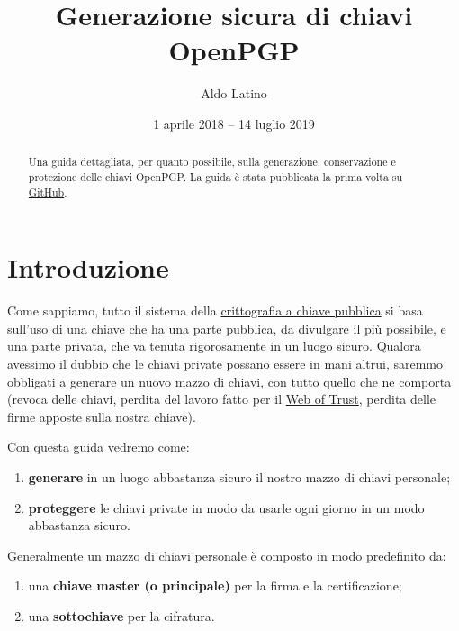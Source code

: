 \documentclass[a4paper,10pt]{article}
\title{Generazione sicura di chiavi OpenPGP}
\author{Aldo Latino}
\date{1 aprile 2018 -- 14 luglio 2019}
\begin{document}
\maketitle


\begin{abstract}
Una guida dettagliata, per quanto possibile, sulla generazione, conservazione e protezione delle chiavi OpenPGP. La guida è stata pubblicata la prima volta su \href{https://github.com/aldolat/generazione-sicura-chiavi-openpgp}{GitHub}.
\end{abstract}

\tableofcontents

\newpage

\section{Introduzione}

Come sappiamo, tutto il sistema della \href{https://it.wikipedia.org/wiki/Crittografia_asimmetrica}{crittografia a chiave pubblica} si basa sull'uso di una chiave che ha una parte pubblica, da divulgare il più possibile, e una parte privata, che va tenuta rigorosamente in un luogo sicuro. Qualora avessimo il dubbio che le chiavi private possano essere in mani altrui, saremmo obbligati a generare un nuovo mazzo di chiavi, con tutto quello che ne comporta (revoca delle chiavi, perdita del lavoro fatto per il \href{https://it.wikipedia.org/wiki/Web_of_trust}{Web of Trust}, perdita delle firme apposte sulla nostra chiave).

Con questa guida vedremo come:

\begin{enumerate}
 \item \textbf{generare} in un luogo abbastanza sicuro il nostro mazzo di chiavi personale;
 \item \textbf{proteggere} le chiavi private in modo da usarle ogni giorno in un modo abbastanza sicuro.
\end{enumerate}

Generalmente un mazzo di chiavi personale è composto in modo predefinito da:

\begin{enumerate}
 \item una \textbf{chiave master (o principale)} per la firma e la certificazione;
 \item una \textbf{sottochiave} per la cifratura.
\end{enumerate}
\end{document}
